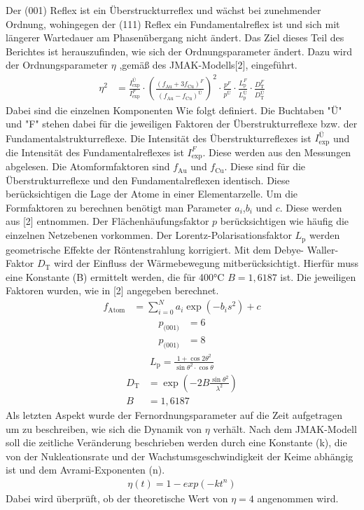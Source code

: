 \documentclass[
	a4paper,
	12pt,
	pagesize,
	ngerman
]{scrartcl}
\begin{document}
Der (001) Reflex ist ein Überstruckturreflex und wächst bei zunehmender Ordnung, wohingegen der (111) Reflex ein Fundamentalreflex ist und sich mit längerer Wartedauer am Phasenübergang nicht ändert. Das Ziel dieses Teil des Berichtes ist herauszufinden, wie sich der Ordnungsparameter ändert. Dazu wird der Ordnungsparameter $\eta$ ,gemäß des JMAK-Modells[2], eingeführt. \\
\begin{align}
    \eta^2 &= {\frac{I_\text{exp}^{Ü}}{I_\text{exp}^{F}}}
    \cdot 
    ({\frac{(f_\text{Au}+3f_\text{Cu})^{F}}{(f_\text{Au}-f_\text{Cu})^{Ü}}})^{2}
    \cdot
    {\frac{p^{F}}{p^{Ü}}}
    \cdot
    {\frac{L_\text{p}^{F}}{L_\text{p}^{Ü}}}
    \cdot
    {\frac{D_\text{T}^{F}}{D_\text{T}^{Ü}}}
    \label{F1}
\end{align}
 Dabei sind die einzelnen Komponenten Wie folgt definiert. Die Buchtaben "Ü" und "F" stehen dabei für die jeweiligen Faktoren der Überstrukturreflexe bzw. der Fundamentalstrukturreflexe. Die Intensität des Überstrukturreflexes ist $I_\text{exp}^{Ü}$ und die Intensität des Fundamentalreflexes ist $I_\text{exp}^{F}$. Diese werden aus den Messungen abgelesen.
 Die Atomformfaktoren sind $f_\text{Au}$ und $f_\text{Cu}$. Diese sind für die Überstrukturreflexe und den Fundamentalreflexen identisch. Diese berücksichtigen die Lage der Atome in einer Elementarzelle. Um die Formfaktoren zu berechnen benötigt man Parameter $a_i$,$b_i$ und $c$. Diese werden aus [2] entnommen.
 Der Flächenhäufungsfaktor $p$ berücksichtigen wie häufig die einzelnen Netzebenen vorkommen. 
 Der Lorentz-Polarisationsfaktor $L_\text{p}$ werden geometrische Effekte der Röntenstrahlung korrigiert.
 Mit dem Debye- Waller-Faktor $D_\text{T}$ wird der Einfluss der Wärmebewegung mitberücksichtigt. Hierfür muss eine Konstante (B) ermittelt werden, die für 400°C $B = 1,6187$ ist.
 Die jeweiligen Faktoren wurden, wie in [2] angegeben berechnet. 
 \begin{align}
     f_\text{Atom} &= \sum_{i=0}^N a_i\exp{(-b_is^2)} +c
 \end{align}
 \begin{align}
     p_\text{(001)} &= 6 \\
     p_\text{(001)} &= 8
 \end{align}
\begin{align}
    L_\text{p} = \frac{1+\cos{2\theta}^2}{\sin{\theta}^2\cdot\cos{\theta}}
\end{align}
\begin{align}
    D_\text{T} &= \exp{(-2B\frac{\sin{\theta}^2}{\lambda^2})} \\
    B &= 1,6187
\end{align}
Als letzten Aspekt wurde der Fernordnungsparameter auf die Zeit aufgetragen um zu beschreiben, wie sich die Dynamik von $\eta$ verhält. Nach dem JMAK-Modell soll die zeitliche Veränderung beschrieben werden durch eine Konstante (k), die von der Nukleationsrate und der Wachstumsgeschwindigkeit der Keime abhängig ist und dem Avrami-Exponenten (n).
\begin{align}
    \eta(t) = 1- exp(-kt^n)
\end{align}
Dabei wird überprüft, ob der theoretische Wert von $\eta = 4$ angenommen wird.
\end{document}
